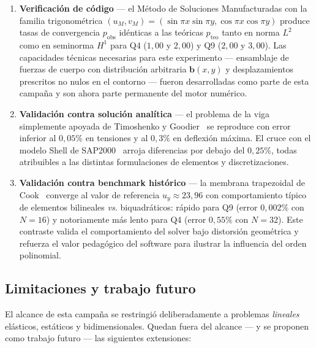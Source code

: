 \begin{enumerate}
  \item \textbf{Verificación de código} — el Método de Soluciones
        Manufacturadas con la familia trigonométrica
        $(u_M, v_M) = (\sin\pi x \sin\pi y, \cos\pi x \cos\pi y)$ produce
        tasas de convergencia $p_{\mathrm{obs}}$ idénticas a las teóricas
        $p_{\mathrm{teo}}$ tanto en norma $L^2$ como en seminorma $H^1$
        para Q4 ($1{,}00$ y $2{,}00$) y Q9 ($2{,}00$ y $3{,}00$). Las
        capacidades técnicas necesarias para este experimento —
        ensamblaje de fuerzas de cuerpo con distribución arbitraria
        $\mathbf{b}(x,y)$ y desplazamientos prescritos no nulos en el
        contorno — fueron desarrolladas como parte de esta campaña y son
        ahora parte permanente del motor numérico.

  \item \textbf{Validación contra solución analítica} — el problema de la
        viga simplemente apoyada de Timoshenko y
        Goodier~\cite{timoshenko1970theory} se reproduce con error inferior
        al $0{,}05\%$ en tensiones y al $0{,}3\%$ en deflexión máxima.
        El cruce con el modelo Shell de
        SAP2000~\cite{computersandstructures2024sap2000} arroja diferencias
        por debajo del $0{,}25\%$, todas atribuibles a las distintas
        formulaciones de elementos y discretizaciones.

  \item \textbf{Validación contra benchmark histórico} — la membrana
        trapezoidal de Cook~\cite{cook1974improved} converge al valor de
        referencia $u_y \approx 23{,}96$ con comportamiento típico de
        elementos bilineales \emph{vs.} biquadráticos:
        rápido para Q9 (error $0{,}002\%$ con $N=16$) y notoriamente
        más lento para Q4 (error $0{,}55\%$ con $N=32$). Este
        contraste valida el comportamiento del solver bajo distorsión
        geométrica y refuerza el valor pedagógico del software para
        ilustrar la influencia del orden polinomial.
\end{enumerate}

\subsection{Limitaciones y trabajo futuro}

El alcance de esta campaña se restringió deliberadamente a problemas
\emph{lineales} elásticos, estáticos y bidimensionales. Quedan fuera del
alcance — y se proponen como trabajo futuro — las siguientes extensiones:

